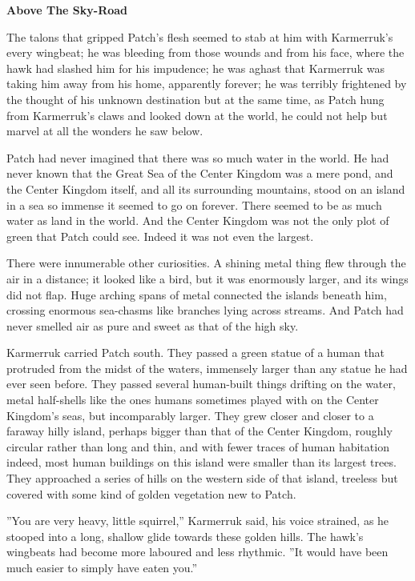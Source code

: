 \documentclass[11pt]{article}
\begin{document}
\par
{\bf Above The Sky-Road\par
}\par
 The talons that gripped Patch's flesh seemed to stab at him with Karmerruk's every wingbeat; he was bleeding from those wounds and from his face, where the hawk had slashed him for his impudence; he was aghast that Karmerruk was taking him away from his home, apparently forever; he was terribly frightened by the thought of his unknown destination %
 but at the same time, as Patch hung from Karmerruk's claws and looked down at the world, he could not help but marvel at all the wonders he saw below.\par
Patch had never imagined that there was so much water in the world. He had never known that the Great Sea of the Center Kingdom was a mere pond, and the Center Kingdom itself, and all its surrounding mountains, stood on an island in a sea so immense it seemed to go on forever. There seemed to be as much water as land in the world. And the Center Kingdom was not the only plot of green that Patch could see. Indeed it was not even the largest.\par
There were innumerable other curiosities. A shining metal thing flew through the air in a distance; it looked like a bird, but it was enormously larger, and its wings did not flap. Huge arching spans of metal connected the islands beneath him, crossing enormous sea-chasms like branches lying across streams. And Patch had never smelled air as pure and sweet as that of the high sky.\par
Karmerruk carried Patch south. They passed a green statue of a human that protruded from the midst of the waters, immensely larger than any statue he had ever seen before. They passed several human-built things drifting on the water, metal half-shells like the ones humans sometimes played with on the Center Kingdom's seas, but incomparably larger. They grew closer and closer to a faraway hilly island, perhaps bigger than that of the Center Kingdom, roughly circular rather than long and thin, and with fewer traces of human habitation %
 indeed, most human buildings on this island were smaller than its largest trees. They approached a series of hills on the western side of that island, treeless but covered with some kind of golden vegetation new to Patch.\par
''You are very heavy, little squirrel,'' Karmerruk said, his voice strained, as he stooped into a long, shallow glide towards these golden hills. The hawk's wingbeats had become more laboured and less rhythmic. ''It would have been much easier to simply have eaten you.''\par
\end{document}
